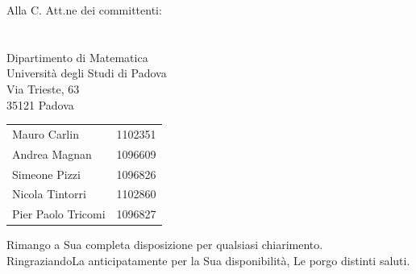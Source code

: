 \documentclass[a4paper,12pt]{letteracdp}
\begin{document}
\begin{letter}{
    Alla C. Att.ne dei committenti: \\
    \COMMITTENTE \\
    \CARDIN      \\
    Dipartimento di Matematica \\
		Università degli Studi di Padova \\
		Via Trieste, 63 \\
		35121 Padova}
\begin{center}
\begin{tabular}{l c}
        Mauro Carlin 	 	& 1102351  \\
        Andrea Magnan    	& 1096609  \\
        Simeone Pizzi    	& 1096826  \\
        Nicola Tintorri    	& 1102860  \\
        Pier Paolo Tricomi 	& 1096827  \\
      \end{tabular}
    \end{center}
    \closing{Rimango a Sua completa disposizione per qualsiasi chiarimento. \\
	RingraziandoLa anticipatamente per la Sua disponibilità, Le porgo distinti saluti.}
  \end{letter}
\end{document}

